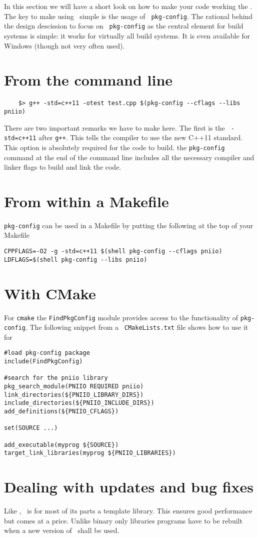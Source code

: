 
In this section we will have a short look on how to make your code working the
\libpniio. The key to make using \libpniio\ simple is the usage of \texttt{
pkg-config}. The rational behind the design descission to focus on \texttt{
pkg-config} as the central element for build systems is simple: it works for
virtually all build systems. It is even available for Windows (though not very
often used). 

\section{From the command line}

\begin{verbatim}
    $> g++ -std=c++11 -otest test.cpp $(pkg-config --cflags --libs pniio)
\end{verbatim}
There are two important remarks we have to make here. The first is the \texttt{
-std=c++11} after \texttt{g++}. This tells the compiler to use the new C++11
standard. This option is absolutely required for the code to build. 
the \texttt{pkg-config} command at the end of the command line includes all the
necessary compiler and linker flags to build and link the code.

\section{From within a Makefile}

\texttt{pkg-config} can be used in a Makefile by putting the following at the top
of your Makefile
\begin{verbatim}
CPPFLAGS=-O2 -g -std=c++11 $(shell pkg-config --cflags pniio)
LDFLAGS=$(shell pkg-config --libs pniio)
\end{verbatim}

\section{With CMake}

For \texttt{cmake} the \texttt{FindPkgConfig} module provides access to the
functionality of \texttt{pkg-config}. The following snippet from a \texttt{
CMakeLists.txt} file shows how to use it for \libpniio
\begin{verbatim}
#load pkg-config package
include(FindPkgConfig)

#search for the pniio library 
pkg_search_module(PNIIO REQUIRED pniio)
link_directories(${PNIIO_LIBRARY_DIRS})
include_directories(${PNIIO_INCLUDE_DIRS})
add_definitions(${PNIIO_CFLAGS})

set(SOURCE ...)

add_executable(myprog ${SOURCE})
target_link_libraries(myprog ${PNIIO_LIBRARIES})
\end{verbatim}

\section{Dealing with updates and bug fixes}

Like \libpnicore, \libpniio\ is for most of its parts a template library. This
ensures good performance but comes at a price. Unlike binary only libraries
programs have to be rebuilt when a new version of \libpniio\ shall be used. 


